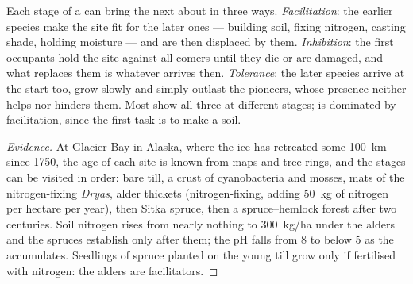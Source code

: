 \begin{proposition}\label{prop:b1:ecosystem-dynamics:mechanisms}
Each stage of a  can bring the next about in three ways.
\emph{Facilitation}: the earlier species make the site fit for the
later ones --- building soil, fixing nitrogen, casting shade,
holding moisture --- and are then displaced by them. \emph{Inhibition}:
the first occupants hold the site against all comers until they die
or are damaged, and what replaces them is whatever arrives then.
\emph{Tolerance}: the later species arrive at the start too, grow
slowly and simply outlast the pioneers, whose presence neither helps
nor hinders them. Most  show all three at different
stages;  is dominated by facilitation, since the
first task is to make a soil.
\end{proposition}
\begin{proof}[Evidence]
At Glacier Bay in Alaska, where the ice has retreated some
\qty{100}{km} since 1750, the age of each site is known from maps and
tree rings, and the stages can be visited in order: bare till, a
crust of cyanobacteria and mosses, mats of the nitrogen-fixing
\emph{Dryas}, alder thickets (nitrogen-fixing, adding
\qty{50}{kg} of nitrogen per hectare per year), then Sitka spruce,
then a spruce--hemlock forest after two centuries. Soil nitrogen rises
from nearly nothing to \qty{300}{kg/ha} under the alders and the
spruces establish only after them; the pH falls from 8 to below 5 as
the  accumulates. Seedlings of spruce planted on the young till
grow only if fertilised with nitrogen: the alders are facilitators.
\end{proof}

